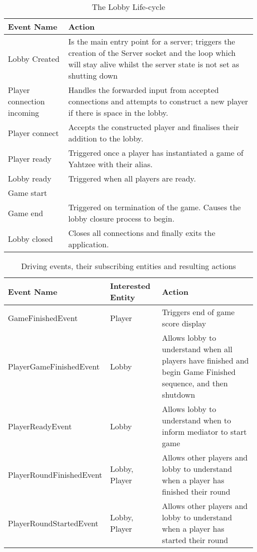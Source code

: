 \begin{table}[H]
	\centering
	\begin{tabular}{ | l | p{10cm} | }
		\hline
		Event Name & Action  \\
		\hline
		\hline
		Lobby Created & Is the main entry point for a server; triggers the creation of the Server socket and the loop which will stay alive whilst the server state is not set as shutting down \\
		\hline
		Player connection incoming & Handles the forwarded input from accepted connections and attempts to construct a new player if there is space in the lobby. \\
		\hline
		Player connect & Accepts the constructed player and finalises their addition to the lobby. \\
		\hline
		Player ready & Triggered once a player has instantiated a game of Yahtzee with their alias. \\
		\hline
		Lobby ready & Triggered when all players are ready. \\ 
		\hline
		Game start  & \\
		\hline
		Game end  & Triggered on termination of the game. Causes the lobby closure process to begin. \\
		\hline
		Lobby closed & Closes all connections and finally exits the application. \\
		\hline
	\end{tabular}
	\caption{The Lobby Life-cycle}
	\label{tab:lobbyLifecycle}
\end{table}

\begin{table}[H]
	\centering
	\begin{tabular}{ | l | l | p{10cm} | }
		\hline
		Event Name & Interested Entity & Action  \\
		\hline
		\hline
		GameFinishedEvent & Player & Triggers end of game score display\\ 
		\hline
		PlayerGameFinishedEvent & Lobby & Allows lobby to understand when all players have finished and begin Game Finished sequence, and then shutdown \\
		\hline
		PlayerReadyEvent & Lobby & Allows lobby to understand when to inform mediator to start game \\
		\hline
		PlayerRoundFinishedEvent & Lobby, Player & Allows other players and lobby to understand when a player has finished their round \\
		\hline
		PlayerRoundStartedEvent & Lobby, Player & Allows other players and lobby to understand when a player has started their round \\
		\hline
	\end{tabular}
	\caption{Driving events, their subscribing entities and resulting actions}
	\label{tab:eventsEntitiesAndActions}
\end{table}
